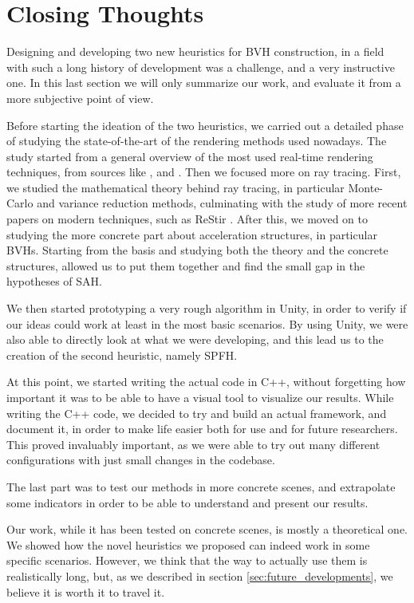 \documentclass{PoliMi_MasterThesis}
\begin{document}
\section{Closing Thoughts} \label{sec:closing_thoughts}
Designing and developing two new heuristics for BVH construction, in a field with such a long history of development was a challenge, and a very instructive one. In this last section we will only summarize our work, and evaluate it from a more subjective point of view.

Before starting the ideation of the two heuristics, we carried out a detailed phase of studying the state-of-the-art of the rendering methods used nowadays. The study started from a general overview of the most used real-time rendering techniques, from sources like \cite{real_time_rendering_book}, \cite{pbr_book} and \cite{ray_tracing_gems_book}. Then we focused more on ray tracing. First, we studied the mathematical theory behind ray tracing, in particular Monte-Carlo and variance reduction methods, culminating with the study of more recent papers on modern techniques, such as ReStir \cite{restir}. After this, we moved on to studying the more concrete part about acceleration structures, in particular BVHs. Starting from the basis and studying both the theory and the concrete structures, allowed us to put them together and find the small gap in the hypotheses of SAH.

We then started prototyping a very rough algorithm in Unity, in order to verify if our ideas could work at least in the most basic scenarios. By using Unity, we were also able to directly look at what we were developing, and this lead us to the creation of the second heuristic, namely SPFH. 

At this point, we started writing the actual code in C++, without forgetting how important it was to be able to have a visual tool to visualize our results. While writing the C++ code, we decided to try and build an actual framework, and document it, in order to make life easier both for use and for future researchers. This proved invaluably important, as we were able to try out many different configurations with just small changes in the codebase.

The last part was to test our methods in more concrete scenes, and extrapolate some indicators in order to be able to understand and present our results.

Our work, while it has been tested on concrete scenes, is mostly a theoretical one. We showed how the novel heuristics we proposed can indeed work in some specific scenarios. However, we think that the way to actually use them is realistically long, but, as we described in section \ref{sec:future_developments}, we believe it is worth it to travel it.
\end{document}
